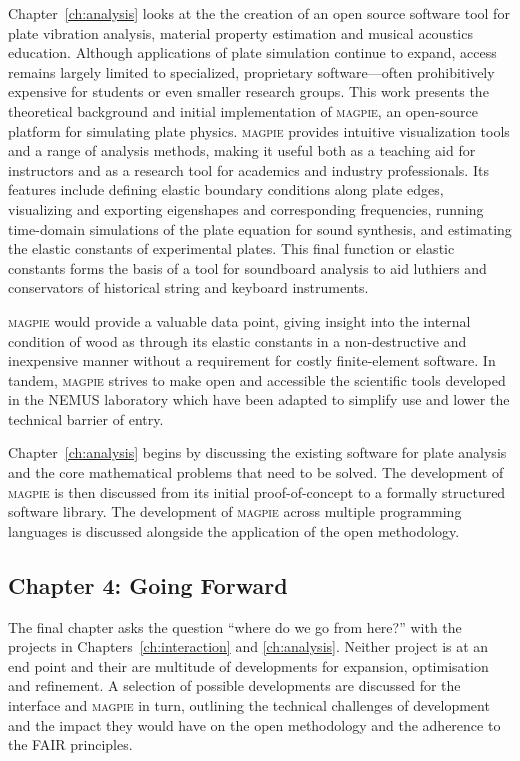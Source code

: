 Chapter~\ref{ch:analysis} looks at the  the creation of an open source software
tool for plate vibration analysis, material property estimation and musical
acoustics education. Although applications of plate simulation continue to
expand, access remains largely limited to specialized, proprietary
software—often prohibitively expensive for students or even smaller research
groups. This work presents the theoretical background and initial implementation
of \textsc{magpie}, an open-source platform for simulating plate physics.
\textsc{magpie} provides intuitive visualization tools and a range of analysis
methods, making it useful both as a teaching aid for instructors and as a
research tool for academics and industry professionals. Its features include
defining elastic boundary conditions along plate edges, visualizing and
exporting eigenshapes and corresponding frequencies, running time-domain
simulations of the plate equation for sound synthesis, and estimating the
elastic constants of experimental plates. This final function or elastic
constants forms the basis of a tool for soundboard analysis to aid luthiers and
conservators of historical string and keyboard instruments. 

\textsc{magpie} would provide a valuable data point, giving insight into the
internal condition of wood as through its elastic constants in a non-destructive
and inexpensive manner without a requirement for costly finite-element software.
In tandem, \textsc{magpie} strives to make open and accessible the scientific
tools developed in the NEMUS laboratory which have been adapted to simplify use
and lower the technical barrier of entry.

Chapter~\ref{ch:analysis} begins by discussing the existing software for plate
analysis and the core mathematical problems that need to be solved. The
development of \textsc{magpie} is then discussed from its initial
proof-of-concept to a formally structured software library. The development of
\textsc{magpie} across multiple programming languages is discussed alongside the
application of the open methodology.


\subsection{Chapter 4: Going Forward}

The final chapter asks the question ``where do we go from here?'' with the
projects in Chapters~\ref{ch:interaction} and \ref{ch:analysis}. Neither project
is at an end point and their are multitude of developments for expansion,
optimisation and refinement. A selection of possible developments are discussed
for the interface and \textsc{magpie} in turn, outlining the technical
challenges of development and the impact they would have on the open methodology
and the adherence to the FAIR principles.

